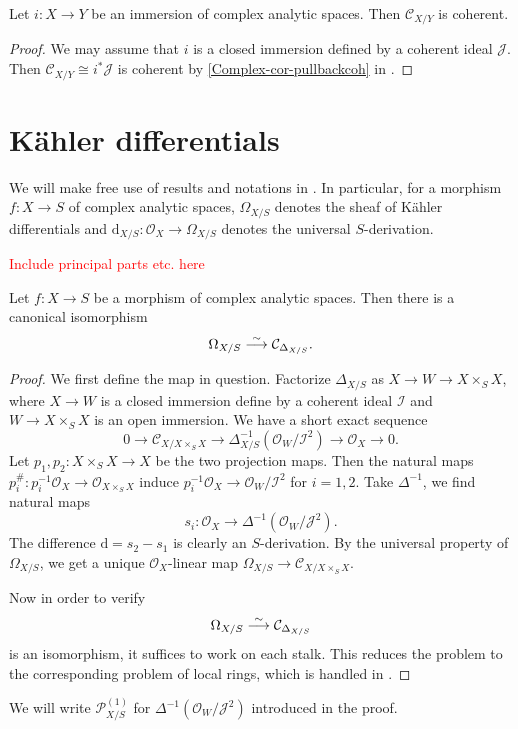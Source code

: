 \begin{proposition}\label{prop-conormalcoherent}
    Let $i:X\rightarrow Y$ be an immersion of complex analytic spaces. Then $\mathcal{C}_{X/Y}$ is coherent.
\end{proposition}
\begin{proof}
    We may assume that $i$ is a closed immersion defined by a coherent ideal $\mathcal{J}$. Then $\mathcal{C}_{X/Y}\cong i^*\mathcal{J}$ is coherent by \cref{Complex-cor-pullbackcoh} in .
\end{proof}


\section{Kähler differentials}

We will make free use of results and notations in \cite[\href{https://stacks.math.columbia.edu/tag/08RL}{Tag 08RL}]{stacks-project}. In particular, for a morphism $f:X\rightarrow S$ of complex analytic spaces, $\Omega_{X/S}$ denotes the sheaf of Kähler differentials and $\mathrm{d}_{X/S}:\mathcal{O}_X\rightarrow \Omega_{X/S}$ denotes the universal $S$-derivation.

\textcolor{red}{Include principal parts etc. here}
\begin{proposition}\label{prop-Kahlerdiffconormal}
    Let $f:X\rightarrow S$ be a morphism of complex analytic spaces. Then there is a canonical isomorphism
    \[
        \Omega_{X/S}\stackrel{\sim}{\longrightarrow}  \mathcal{C}_{\Delta_{X/S}}.
    \]
\end{proposition}
\begin{proof}
    We first define the map in question.
    Factorize $\Delta_{X/S}$ as $X\rightarrow W\rightarrow X\times_S X$, where $X\rightarrow W$ is a closed immersion define by a coherent ideal $\mathcal{I}$ and $W\rightarrow X\times_S X$ is an open immersion.  We have a short exact sequence
    \[
        0\rightarrow \mathcal{C}_{X/X\times_S X}\rightarrow \Delta_{X/S}^{-1}(\mathcal{O}_W/\mathcal{I}^2)\rightarrow \mathcal{O}_X\rightarrow 0.  
    \]
    Let $p_1,p_2:X\times_S X\rightarrow X$ be the two projection maps. Then the natural maps $p_i^{\#}:p_i^{-1}\mathcal{O}_X\rightarrow \mathcal{O}_{X\times_S X}$ induce $p_i^{-1}\mathcal{O}_X\rightarrow \mathcal{O}_W/\mathcal{I}^2$ for $i=1,2$. Take $\Delta^{-1}$, we find natural maps
    \[
        s_i:\mathcal{O}_X\rightarrow \Delta^{-1}(\mathcal{O}_W/\mathcal{J}^2).  
    \]
    The difference $\mathrm{d}=s_2-s_1$ is clearly an $S$-derivation. By the universal property of $\Omega_{X/S}$, we get a unique $\mathcal{O}_{X}$-linear map $\Omega_{X/S}\rightarrow \mathcal{C}_{X/X\times_S X}$.

    Now in order to verify 
    \[
        \Omega_{X/S}\stackrel{\sim}{\longrightarrow}  \mathcal{C}_{\Delta_{X/S}}
    \]
    is an isomorphism, it suffices to work on each stalk. This reduces the problem to the corresponding problem of local rings, which is handled in \cite[\href{https://stacks.math.columbia.edu/tag/08S2}{Tag 08S2}]{stacks-project}.
\end{proof}
We will write $\mathcal{P}^{(1)}_{X/S}$ for $\Delta^{-1}(\mathcal{O}_W/\mathcal{J}^2)$ introduced in the proof.

